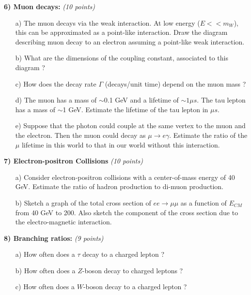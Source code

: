 {\clearpage

\textbf{6) Muon decays: } \hfill \textit{(10 points)}\\
\begin{itemize}
  \item[a)]{ The muon decays via the weak interaction.  At low energy ($E << m_W$), this can be approximated as a point-like interaction. 
  Draw the diagram describing muon decay to an electron assuming a point-like weak interaction. 
  \vspace*{1.5in}
}
  \item[b)]{ What are the dimensions of the coupling constant, associated to this diagram  ?
\vspace*{1.0in}
  }
  \item[c)] How does the decay rate $\Gamma$ (decays/unit time)  depend on the muon mass ? 
\vspace*{1.0in}
  \item[d)]{ The muon has a mass of $\sim$0.1 GeV and a lifetime of $\sim 1 \mu s$. The tau lepton has a mass of {$\sim$1 GeV}. Estimate the lifetime of the tau lepton in $\mu s$.
\vspace*{1.0in}
}
\clearpage
  \item[e)] {Suppose that the photon could couple at the same vertex to the muon and the electron. Then the muon could decay as $\mu\rightarrow e \gamma$. 
  Estimate the ratio of the $\mu$ lifetime in this world to that in our world without this interaction.
  \vspace*{3.0in}
  }
\end{itemize}


\textbf{7) Electron-positron Collisions } \hfill \textit{(10 points)}\\
\begin{itemize}
\item[a)]{Consider electron-positron collisions with a center-of-mass  energy of 40 GeV.
Estimate the ratio of hadron production to di-muon production. 
\vspace*{2in}
}
\item[b)]{Sketch a graph of the total cross section of $ee\rightarrow\mu\mu$ as a function of $E_{CM}$ from 40 GeV to 200. 
Also sketch the component of the cross section due to the electro-magnetic interaction.
\vspace*{1in}
}
\end{itemize}


\textbf{8) Branching ratios:  } \hfill \textit{(9 points)}\\
\begin{itemize}
\item[a)]{How often does a $\tau$ decay to a charged lepton ?
\vspace*{1in}
}
\item[b)]{How often does a $Z$-boson decay to charged leptons ?
\vspace*{1in}
}
\item[c)]{How often does a $W$-boson decay to a charged lepton ?
\vspace*{1in}
}
\end{itemize}

}
